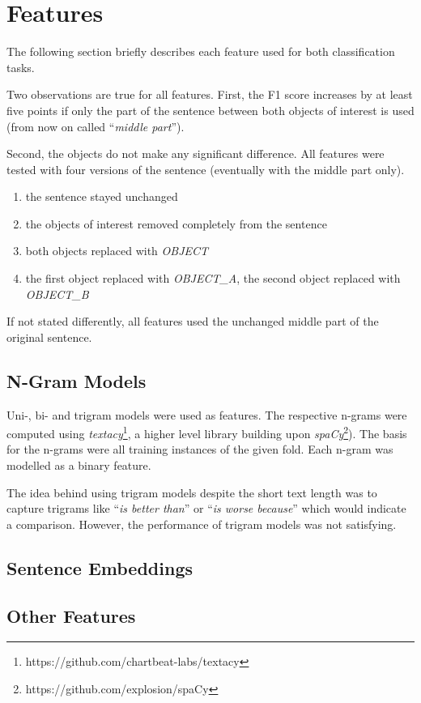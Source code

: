 \section{Features}
The following section briefly describes each feature used for both classification tasks. 

Two observations are true for all features. First, the F1 score increases by at least five points if only the part of the sentence between both objects of interest is used (from now on called \enquote{\emph{middle part}}).

 Second, the objects do not make any significant difference. All features were tested with four versions of the sentence (eventually with the middle part only). 
\begin{enumerate}
\item the sentence stayed unchanged
\item the objects of interest removed completely from the sentence
\item both objects replaced with \emph{OBJECT}
\item the first object replaced with \emph{OBJECT\_A}, the second object replaced with \emph{OBJECT\_B}
\end{enumerate}
If not stated differently, all features used the unchanged middle part of the original sentence.


\subsection{N-Gram Models}
Uni-, bi- and trigram models were used as features. The respective n-grams were computed using \emph{textacy}\footnote{https://github.com/chartbeat-labs/textacy}, a higher level library building upon \emph{spaCy}\footnote{https://github.com/explosion/spaCy}).  The basis for the n-grams were all training instances of the given fold. Each n-gram was modelled as a binary feature. 

The idea behind using trigram models despite the short text length was to capture trigrams like \enquote{\emph{is better than}} or \enquote{\emph{is worse because}} which would indicate a comparison. However, the performance of trigram models was not satisfying.
\label{sec:ngrams}

\subsection{Sentence Embeddings}
\subsection{Other Features}


